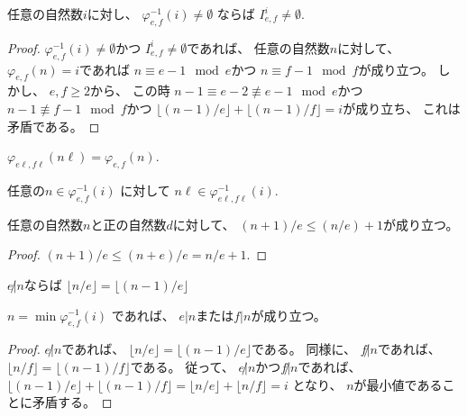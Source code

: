 \begin{lemma}
任意の自然数$i$に対し、
$\varphi_{e,f}^{-1}(i) \ne \emptyset$
ならば
$I_{e,f}^i \ne \emptyset$.
\end{lemma}

\begin{proof}
$\varphi_{e,f}^{-1}(i) \ne \emptyset$かつ
$I_{e,f}^i \ne \emptyset$であれば、
任意の自然数$n$に対して、
$\varphi_{e,f}(n) = i$であれば
$n \equiv e - 1 \mod e$かつ
$n \equiv f - 1 \mod f$が成り立つ。
しかし、
$e, f \ge 2$から、
この時
$n-1 \equiv e - 2 \not \equiv e - 1 \mod e$かつ
$n-1 \not \equiv f - 1 \mod f$かつ
$\lfloor (n-1) / e \rfloor + \lfloor (n-1) / f \rfloor = i$が成り立ち、
これは矛盾である。
\end{proof}

\begin{lemma}
$\varphi_{e \ell, f \ell}(n \ell) = \varphi_{e,f}(n)$.
\end{lemma}

\begin{lemma}
任意の$n \in \varphi_{e,f}^{-1}(i)$
に対して
$n \ell \in \varphi_{e \ell,f \ell}^{-1}(i)$.
\end{lemma}

\begin{lemma}
\label{lm:add_one_div_le_div_add_one}
任意の自然数$n$と正の自然数$d$に対して、
$(n+1)/e \le (n/e) + 1$が成り立つ。
\end{lemma}

\begin{proof}
$
(n+1)/e \le (n+e)/e = n/e+1
$.
\end{proof}

\begin{lemma}
\label{lm:e_not_dvd_n_n_div_e_eq_n_sub_1_div_e}
$e \not | n$ならば
$\lfloor n / e \rfloor = \lfloor (n-1) / e \rfloor$
\end{lemma}

\begin{lemma}
$n = \min \varphi_{e,f}^{-1}(i)$
であれば、
$e | n$または$f | n$が成り立つ。
\end{lemma}

\begin{proof}
$e \not | n$であれば、
$\lfloor n / e \rfloor = \lfloor (n-1) / e \rfloor$である。
同様に、
$f \not | n$であれば、
$\lfloor n / f \rfloor = \lfloor (n-1) / f \rfloor$である。
従って、
$e \not | n$かつ$f \not | n$であれば、
$
\lfloor (n-1) / e \rfloor + \lfloor (n-1) / f \rfloor
= \lfloor n / e \rfloor + \lfloor n / f \rfloor
= i
$
となり、
$n$が最小値であることに矛盾する。
\end{proof}

